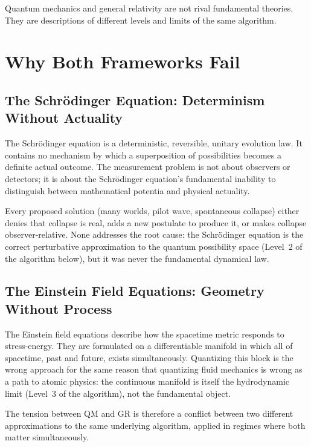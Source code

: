 \documentclass[11pt,a4paper]{article}
\theoremstyle{plain}
\theoremstyle{definition}
\theoremstyle{remark}
\begin{document}
Quantum mechanics and general relativity are not rival fundamental theories. They
are descriptions of different levels and limits of the same algorithm.

\section{Why Both Frameworks Fail}
\label{sec:failure}

\subsection{The Schr\"{o}dinger Equation: Determinism Without Actuality}

The Schr\"{o}dinger equation is a deterministic, reversible, unitary evolution
law. It contains no mechanism by which a superposition of possibilities becomes
a definite actual outcome. The measurement problem is not about observers or
detectors; it is about the Schr\"{o}dinger equation's fundamental inability to
distinguish between mathematical potentia and physical actuality.

Every proposed solution (many worlds, pilot wave, spontaneous collapse) either
denies that collapse is real, adds a new postulate to produce it, or makes collapse
observer-relative. None addresses the root cause: the Schr\"{o}dinger equation is
the correct perturbative approximation to the quantum possibility space (Level~2
of the algorithm below), but it was never the fundamental dynamical law.

\subsection{The Einstein Field Equations: Geometry Without Process}

The Einstein field equations describe how the spacetime metric responds to
stress-energy. They are formulated on a differentiable manifold in which all of
spacetime, past and future, exists simultaneously. Quantizing this block is the
wrong approach for the same reason that quantizing fluid mechanics is wrong as
a path to atomic physics: the continuous manifold is itself the hydrodynamic
limit (Level~3 of the algorithm), not the fundamental object.

The tension between QM and GR is therefore a conflict between two different
approximations to the same underlying algorithm, applied in regimes where both
matter simultaneously.
\end{document}
